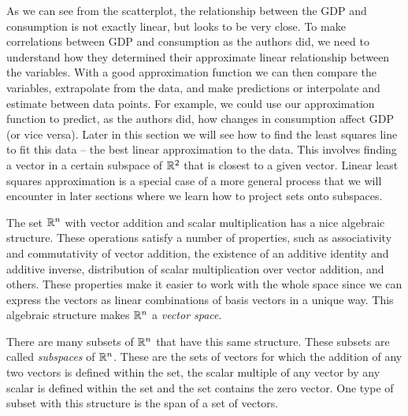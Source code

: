 As we can see from the scatterplot, the relationship between the GDP and consumption is not exactly linear, but looks to be very close. To make correlations between GDP and consumption as the authors did, we need to understand how they determined their approximate linear relationship between the variables.  With a good approximation function we can then compare the variables, extrapolate from the data, and make predictions or interpolate and estimate between data points. For example, we could use our approximation function to predict, as the authors did, how changes in consumption affect GDP (or vice versa). Later in this section we will see how to find the least squares line to fit this data -- the best linear approximation to the data. This involves finding a vector in a certain subspace of $\mathbb{R}^2$ that is closest to a given vector. Linear least squares approximation is a special case of a more general process that we will encounter in later sections where we learn how to project sets onto subspaces. 


\label{sec:rn_intro}

The set $\mathbb{R}^n$ with vector addition and scalar multiplication has a nice algebraic structure. These operations satisfy a number of properties, such as associativity and commutativity of vector addition, the existence of an additive identity and additive inverse, distribution of scalar multiplication over vector addition, and others. These properties make it easier to work with the whole space since we can express the vectors as linear combinations of basis vectors in a unique way. This algebraic structure makes $\mathbb{R}^n$ a \emph{vector space}. 

There are many subsets of $\mathbb{R}^n$ that have this same structure. These subsets are called \emph{subspaces} of $\mathbb{R}^n$. These are the sets of vectors for which the addition of any two vectors is defined within the set, the scalar multiple of any vector by any scalar is defined within the set and the set contains the zero vector. One type of subset with this structure is the span of a set of vectors. 
 
